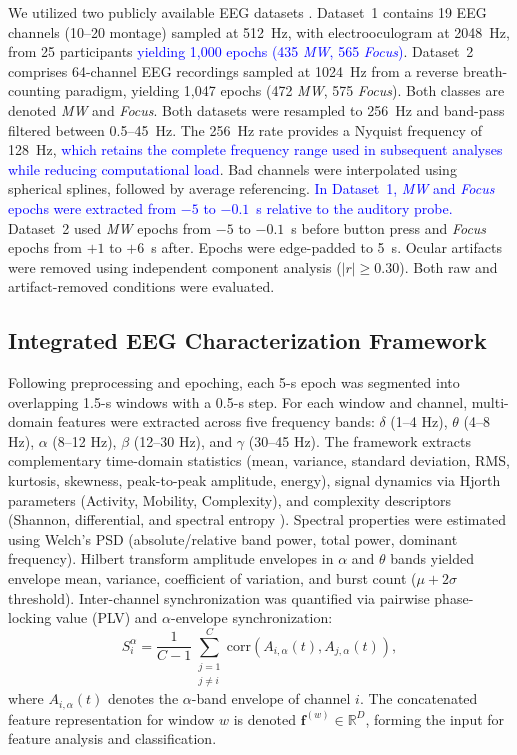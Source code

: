 \documentclass[conference]{IEEEtran}
\begin{document}
We utilized two publicly available EEG datasets \cite{rodlarios,grandchamp2014oculometric}. Dataset~1 \cite{rodlarios} contains 19 EEG channels (10--20 montage) sampled at 512~Hz, with electrooculogram at 2048~Hz, from 25 participants \textcolor{blue}{yielding 1,000 epochs (435 \textit{MW}, 565 \textit{Focus})}. Dataset~2 \cite{grandchamp2014oculometric} comprises 64-channel EEG recordings sampled at 1024~Hz from a reverse breath-counting paradigm, yielding 1,047 epochs (472 \textit{MW}, 575 \textit{Focus}). Both classes are denoted \textit{MW} and \textit{Focus}.
Both datasets were resampled to 256~Hz and band-pass filtered between 0.5--45~Hz. The 256~Hz rate provides a Nyquist frequency of 128~Hz, \textcolor{blue}{which retains the complete frequency range used in subsequent analyses while reducing computational load}. Bad channels were interpolated using spherical splines, followed by average referencing. \textcolor{blue}{In Dataset~1, \textit{MW} and \textit{Focus} epochs were extracted from $-5$ to $-0.1$~s relative to the auditory probe.} Dataset~2 used \textit{MW} epochs from $-5$ to $-0.1$~s before button press and \textit{Focus} epochs from $+1$ to $+6$~s after. Epochs were edge-padded to 5~s. Ocular artifacts were removed using independent component analysis \cite{delorme2004eeglab} ($|r|\geq0.30$). Both raw and artifact-removed conditions were evaluated.

\subsection{Integrated EEG Characterization Framework}

Following preprocessing and epoching, each 5-s epoch was segmented into overlapping 1.5-s windows with a 0.5-s step. For each window and channel, multi-domain features were extracted across five frequency bands: $\delta$ (1--4 Hz), $\theta$ (4--8 Hz), $\alpha$ (8--12 Hz), $\beta$ (12--30 Hz), and $\gamma$ (30--45 Hz).
The framework extracts complementary time-domain statistics (mean, variance, standard deviation, RMS, kurtosis, skewness, peak-to-peak amplitude, energy), signal dynamics via Hjorth parameters (Activity, Mobility, Complexity), and complexity descriptors (Shannon, differential, and spectral entropy \cite{zhang2018integration}). Spectral properties were estimated using Welch's PSD \cite{safi2021early} (absolute/relative band power, total power, dominant frequency). Hilbert transform amplitude envelopes \cite{o2017detecting} in $\alpha$ and $\theta$ bands yielded envelope mean, variance, coefficient of variation, and burst count ($\mu+2\sigma$ threshold). Inter-channel synchronization was quantified via pairwise phase-locking value (PLV) and $\alpha$-envelope synchronization:
\begin{equation}
S_i^{\alpha}
=
\frac{1}{C-1}
\sum_{\substack{j=1\\j\neq i}}^{C}
\mathrm{corr}\left(A_{i,\alpha}(t),A_{j,\alpha}(t)\right),
\end{equation}
where $A_{i,\alpha}(t)$ denotes the $\alpha$-band envelope of channel $i$. The concatenated feature representation for window $w$ is denoted $\mathbf{f}^{(w)} \in \mathbb{R}^D$, forming the input for feature analysis and classification.
\end{document}
